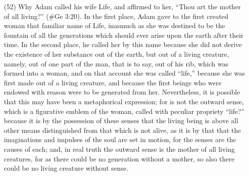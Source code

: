 (52) Why Adam called his wife Life, and affirmed to her, ``Thou art the mother of all living?''
(\#Ge 3:20). In the first place, Adam gave to the first created woman that familiar name of Life,
inasmuch as she was destined to be the fountain of all the generations which should ever arise
upon the earth after their time. In the second place, he called her by this name because she did not
derive the existence of her substance out of the earth, but out of a living creature, namely, out of
one part of the man, that is to say, out of his rib, which was formed into a woman, and on that
account she was called ``life,'' because she was first made out of a living creature, and because
the first beings who were endowed with reason were to be generated from her. Nevertheless, it is
possible that this may have been a metaphorical expression; for is not the outward sense, which is
a figurative emblem of the woman, called with peculiar propriety ``life?'' because it is by the
possession of these senses that the living being is above all other means distinguished from that
which is not alive, as it is by that that the imaginations and impulses of the soul are set in motion,
for the senses are the causes of each; and, in real truth the outward sense is the mother of all
living creatures, for as there could be no generation without a mother, so also there could be no
living creature without sense.

